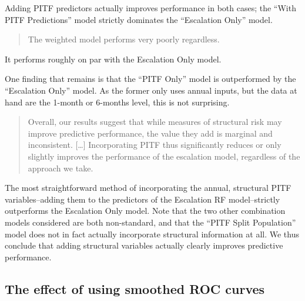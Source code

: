 \documentclass[]{article}
\begin{document}
Adding PITF predictors actually improves performance in both cases; the
``With PITF Predictions'' model strictly dominates the ``Escalation
Only'' model.

\begin{quote}
The weighted model performs very poorly regardless.
\end{quote}

It performs roughly on par with the Escalation Only model.

One finding that remains is that the ``PITF Only'' model is outperformed
by the ``Escalation Only'' model. As the former only uses annual inputs,
but the data at hand are the 1-month or 6-months level, this is not
surprising.

\begin{quote}
Overall, our results suggest that while measures of structural risk may
improve predictive performance, the value they add is marginal and
inconsistent. {[}\ldots{}{]} Incorporating PITF thus significantly
reduces or only slightly improves the performance of the escalation
model, regardless of the approach we take.
\end{quote}

The most straightforward method of incorporating the annual, structural
PITF variables--adding them to the predictors of the Escalation RF
model--strictly outperforms the Escalation Only model. Note that the two
other combination models considered are both non-standard, and that the
``PITF Split Population'' model does not in fact actually incorporate
structural information at all. We thus conclude that adding structural
variables actually clearly improves predictive performance.

\hypertarget{the-effect-of-using-smoothed-roc-curves}{%
\subsection{The effect of using smoothed ROC
curves}\label{the-effect-of-using-smoothed-roc-curves}}
\end{document}
